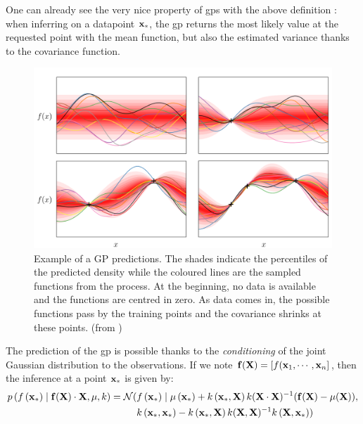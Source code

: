 One can already see the very nice property of \gls{gps} with the above definition : when inferring on a datapoint $\boldsymbol{\mathbf{x}}_\ast$, the \gls{gp} returns the most likely value at the requested point with the mean function, but also the estimated variance thanks to the covariance function. 
\begin{figure}
	\centering
	\includegraphics[width=\textwidth]{Figures/gp_draw.png}
	\caption{Example of a GP predictions. The shades indicate the percentiles of the predicted density while the coloured lines are the sampled functions from the process. At the beginning, no data is available and the functions are centred in zero. As data comes in, the possible functions pass by the training points and the covariance shrinks at these points. (from \cite{duvenaud_automatic_2014})}
	\label{fig:gp_draw}
\end{figure}

The prediction of the \gls{gp} is possible thanks to the \emph{conditioning} of the joint Gaussian distribution to the observations. If we note $\boldsymbol{\mathbf{f}}(\boldsymbol{\mathbf{X}}) = \left[f(\boldsymbol{\mathbf{x}}_1, \cdots, \boldsymbol{\mathbf{x}}_n  \right]$, then the inference at a point $\boldsymbol{\mathbf{x}}_\ast$ is given by:
\begin{equation}\label{eq:gp_prediction}
\begin{aligned}
p\left(f\left(\boldsymbol{\mathbf{x}}_\ast\right) \mid \boldsymbol{\mathbf{f}}(\boldsymbol{\mathbf{X}}) \cdot \boldsymbol{\mathbf{X}}, \mu, k\right)=\mathcal{N}(&f\left(\boldsymbol{\mathbf{x}}_{\ast}\right) \mid \mu\left(\boldsymbol{\mathbf{x}}_\ast \right)+k\left(\boldsymbol{\mathbf{x}}_{\ast}, \boldsymbol{\mathbf{X}}\right) k(\boldsymbol{\mathbf{X}} \cdot \boldsymbol{\mathbf{X}})^{-1}(\boldsymbol{\mathbf{f}}(\boldsymbol{\mathbf{X}})-\mu(\boldsymbol{\mathbf{X}})), \\
&k\left(\boldsymbol{\mathbf{x}}_{\ast}, \boldsymbol{\mathbf{x}}_{\ast}\right)-k\left(\boldsymbol{\mathbf{x}}_{\ast}, \boldsymbol{\mathbf{X}}\right) k(\boldsymbol{\mathbf{X}}, \boldsymbol{\mathbf{X}})^{-1} k\left(\boldsymbol{\mathbf{X}}, \boldsymbol{\mathbf{x}}_{\ast}\right))
\end{aligned}
\end{equation}

